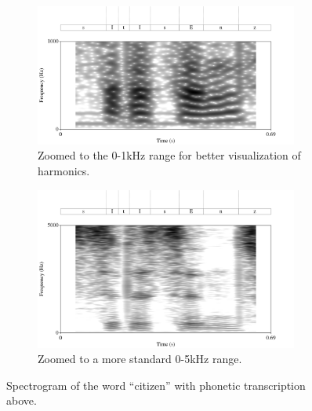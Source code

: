 \documentclass[dissertation,copyright]{uathesis}
\begin{document}
\begin{figure}[h!]
\begin{subfigure}{0.95\textwidth}
  \centering
  \includegraphics[width=0.95\textwidth]{figure/spctgrm1k.png}
  \caption{Zoomed to the 0-1kHz range for better visualization of harmonics.}
  \label{fig:spctgrm1k}
\end{subfigure}%
\hfill
\begin{subfigure}{0.95\textwidth}
  \centering
  \includegraphics[width=0.95\textwidth]{figure/spctgrm5k.png}
  \caption{Zoomed to a more standard 0-5kHz range.}
  \label{fig:spctgrm5k}
\end{subfigure}
\caption{Spectrogram of the word ``citizen'' with phonetic transcription above.}
\label{fig:spctgrm1k5k}
\end{figure}
\end{document}
